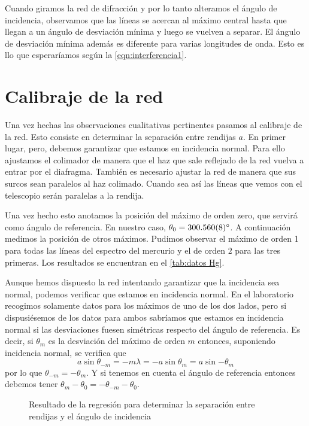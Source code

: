 \documentclass[12pt]{article}
\numberwithin{table}{section}
\numberwithin{figure}{section}
\numberwithin{equation}{section}
\newcommand{\data}[3]{\SI{#1 \pm #2}{#3}}
\begin{document}
Cuando giramos la red de difracción y por lo tanto alteramos el ángulo de incidencia, observamos que las líneas se acercan al máximo central hasta que llegan a un ángulo de desviación mínima y luego se vuelven a separar. El ángulo de desviación mínima además es diferente para varias longitudes de onda. Esto es llo que esperaríamos según la \cref{eqn:interferencia1}.

\section{Calibraje de la red}
Una vez hechas las observaciones cualitativas pertinentes pasamos al calibraje de la red. Esto consiste en determinar la separación entre rendijas \( a \). En primer lugar, pero, debemos garantizar que estamos en incidencia normal. Para ello ajustamos el colimador de manera que el haz que sale reflejado de la red vuelva a entrar por el diafragma. También es necesario ajustar la red de manera que sus surcos sean paralelos al haz colimado. Cuando sea así las líneas que vemos con el telescopio serán paralelas a la rendija. 

Una vez hecho esto anotamos la posición del máximo de orden zero, que servirá como ángulo de referencia. En nuestro caso, \( \theta_0 = \data{300.560}{0.008}{\degree} \). A continuación medimos la posición de otros máximos. Pudimos observar el máximo de orden 1 para todas las líneas del espectro del mercurio y el de orden \( 2 \) para las tres primeras. Los resultados se encuentran en el \cref{tab:datos Hg}.

Aunque hemos dispuesto la red intentando garantizar que la incidencia sea normal, podemos verificar que estamos en incidencia normal. En el laboratorio recogimos solamente datos para los máximos de uno de los dos lados, pero si dispusiésemos de los datos para ambos sabríamos que estamos en incidencia normal si las desviaciones fuesen simétricas respecto del ángulo de referencia. Es decir, si \( \theta_m \) es la desviación del máximo de orden \( m \) entonces, suponiendo incidencia normal, se verifica que 
\begin{equation*}
	a\sin{\theta_{-m}} =  -m\lambda = -a\sin{\theta_m} = a\sin{-\theta_m}
\end{equation*}
por lo que \( \theta_{-m} = -\theta_{m} \). Y si tenemos en cuenta el ángulo de referencia entonces debemos tener \( \theta_m - \theta_0 = -\theta_{-m} - \theta_0 \).

\begin{figure}[htb]
	\small \sffamily \centering
	
	\caption{Resultado de la regresión para determinar la separación entre rendijas y el ángulo de incidencia}
	\label{fig:regr}
\end{figure}
\end{document}
